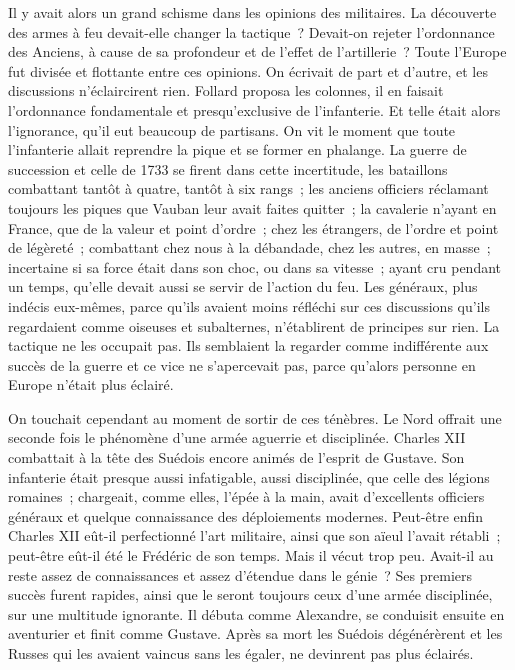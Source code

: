 \documentclass[french,twoside]{book} %
\begin{document}
Il y avait alors un grand schisme dans les opinions des militaires. La découverte des armes à feu devait-elle changer la tactique ? Devait-on rejeter l’ordonnance des Anciens, à cause de sa profondeur et de l’effet de l’artillerie ? Toute l’Europe fut divisée et flottante entre ces opinions. On écrivait de part et d’autre, et les discussions n’éclaircirent rien. Follard proposa les colonnes, il en faisait l’ordonnance fondamentale et presqu’exclusive de l’infanterie. Et telle était alors l’ignorance, qu’il eut beaucoup de partisans. On vit le moment que toute l’infanterie allait reprendre la pique et se former en phalange. La guerre de succession et celle de 1733 se firent dans cette incertitude, les bataillons combattant tantôt à quatre, tantôt à six rangs ; les anciens officiers réclamant toujours les piques que Vauban leur avait faites quitter ; la cavalerie n’ayant en France, que de la valeur et point d’ordre ; chez les étrangers, de l’ordre et point de légèreté ; combattant chez nous à la débandade, chez les autres, en masse ; incertaine si sa force était dans son choc, ou dans sa vitesse ; ayant cru pendant un temps, qu’elle devait aussi se servir de l’action du feu. Les généraux, plus indécis eux-mêmes, parce qu’ils avaient moins réfléchi sur ces discussions qu’ils regardaient comme oiseuses et subalternes, n’établirent de principes sur rien. La tactique ne les occupait pas. Ils semblaient la regarder comme indifférente aux succès de la guerre et ce vice ne s’apercevait pas, parce qu’alors personne en Europe n’était plus éclairé.\par
On touchait cependant au moment de sortir de ces ténèbres. Le Nord offrait une seconde fois le phénomène d’une armée aguerrie et disciplinée. Charles XII combattait à la tête des Suédois encore animés de l’esprit de Gustave. Son infanterie était presque aussi infatigable, aussi disciplinée, que celle des légions romaines ; chargeait, comme elles, l’épée à la main, avait d’excellents officiers généraux et quelque connaissance des déploiements modernes. Peut-être enfin Charles XII eût-il perfectionné l’art militaire, ainsi que son aïeul l’avait rétabli ; peut-être eût-il été le Frédéric de son temps. Mais il vécut trop peu. Avait-il au reste assez de connaissances et assez d’étendue dans le génie ? Ses premiers succès furent rapides, ainsi que le seront toujours ceux d’une armée disciplinée, sur une multitude ignorante. Il débuta comme Alexandre, se conduisit ensuite en aventurier et finit comme Gustave. Après sa mort les Suédois dégénérèrent et les Russes qui les avaient vaincus sans les égaler, ne devinrent pas plus éclairés.\par
\end{document}

